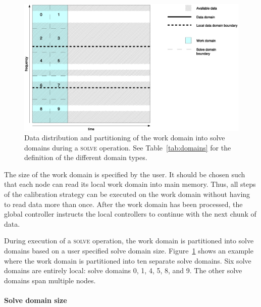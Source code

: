 \documentclass[10pt]{lofar}
\newcommand{\solve}{\textsc{solve}\xspace}
\begin{document}
\begin{figure}[htbp]
\centering
\includegraphics[scale=0.5]{images/solve_domains.eps}
\caption{Data distribution and partitioning of the work domain into solve
domains during a \solve operation. See Table~\ref{tab:domains} for the definition
of the different domain types.}
\label{fig:domains}
\end{figure}

The size of the work domain is specified by the user. It should be chosen such
that each node can read its local work domain into main memory. Thus, all steps
of the calibration strategy can be executed on the work domain without having to
read data more than once. After the work domain has been processed, the global
controller instructs the local controllers to continue with the next chunk of
data.

During execution of a \solve operation, the work domain is partitioned into
solve domains based on a user specified solve domain size.
Figure~\ref{fig:domains} shows an example where the work domain is partitioned
into ten separate solve domains. Six solve domains are entirely local: solve
domains 0, 1, 4, 5, 8, and 9. The other solve domains span multiple nodes.


\paragraph{Solve domain size}
\end{document}
